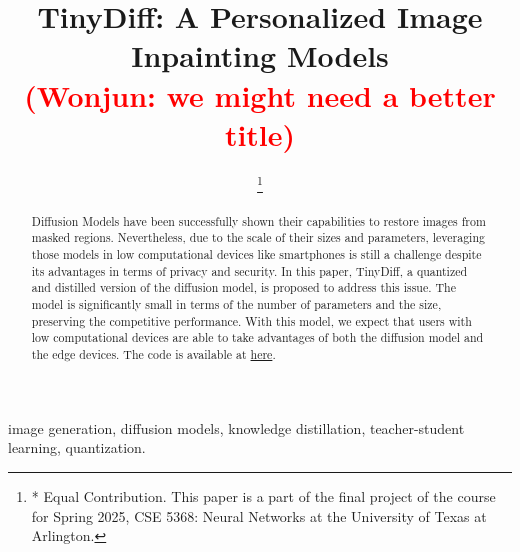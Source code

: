 \documentclass[conference]{IEEEtran}
\newcommand{\WP}[1]{\textcolor{red}{(Wonjun: #1)}}
\begin{document}
\title{TinyDiff: A Personalized Image Inpainting Models \\
{\footnotesize \WP{we might need a better title}}
}

\author{
\thanks{* Equal Contribution. This paper is a part of the final project of the course for Spring 2025, CSE 5368: Neural Networks at the University of Texas at Arlington.}
}

\maketitle

\begin{abstract}
    Diffusion Models have been successfully shown their capabilities to restore images from masked regions.
    Nevertheless, due to the scale of their sizes and parameters,
    leveraging those models in low computational devices like smartphones is still a challenge
    despite its advantages in terms of privacy and security.
    In this paper, TinyDiff, a quantized and distilled version of the diffusion model, is proposed to address this issue.
    The model is significantly small in terms of the number of parameters and the size, preserving the competitive performance.
    With this model, we expect that users with low computational devices are able to take advantages of both the diffusion model and the edge devices.
    The code is available at \href{https://github.com}{here}.
\end{abstract}

\begin{IEEEkeywords}
    image generation, diffusion models, knowledge distillation, teacher-student learning, quantization.
\end{IEEEkeywords}













\printglossary[type=\acronymtype]
\end{document}
